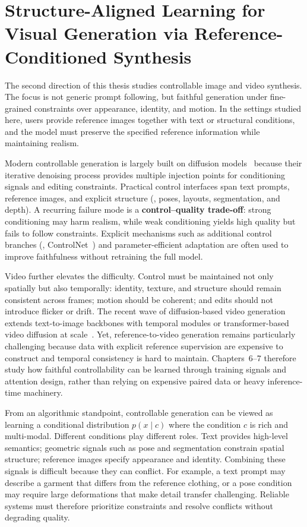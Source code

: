 \section[Structure-Aligned Learning for Visual Generation]{Structure-Aligned Learning for Visual Generation via Reference-Conditioned Synthesis}
The second direction of this thesis studies controllable image and video synthesis. The focus is not generic prompt following, but faithful generation under fine-grained constraints over appearance, identity, and motion. In the settings studied here, users provide reference images together with text or structural conditions, and the model must preserve the specified reference information while maintaining realism.

Modern controllable generation is largely built on diffusion models~\citep{ho2020denoising, rombach2022high} because their iterative denoising process provides multiple injection points for conditioning signals and editing constraints. Practical control interfaces span text prompts, reference images, and explicit structure (\eg, poses, layouts, segmentation, and depth). A recurring failure mode is a \textbf{control--quality trade-off}: strong conditioning may harm realism, while weak conditioning yields high quality but fails to follow constraints. Explicit mechanisms such as additional control branches (\eg, ControlNet~\citep{zhang2023adding}) and parameter-efficient adaptation are often used to improve faithfulness without retraining the full model.

Video further elevates the difficulty. Control must be maintained not only spatially but also temporally: identity, texture, and structure should remain consistent across frames; motion should be coherent; and edits should not introduce flicker or drift. The recent wave of diffusion-based video generation extends text-to-image backbones with temporal modules or transformer-based video diffusion at scale~\citep{blattmann2023stable, guo2023animatediff, peebles2023scalable}. Yet, reference-to-video generation remains particularly challenging because data with explicit reference supervision are expensive to construct and temporal consistency is hard to maintain. Chapters~6--7 therefore study how faithful controllability can be learned through training signals and attention design, rather than relying on expensive paired data or heavy inference-time machinery.

From an algorithmic standpoint, controllable generation can be viewed as learning a conditional distribution $p(x \mid c)$ where the condition $c$ is rich and multi-modal. Different conditions play different roles. Text provides high-level semantics; geometric signals such as pose and segmentation constrain spatial structure; reference images specify appearance and identity. Combining these signals is difficult because they can conflict. For example, a text prompt may describe a garment that differs from the reference clothing, or a pose condition may require large deformations that make detail transfer challenging. Reliable systems must therefore prioritize constraints and resolve conflicts without degrading quality.


